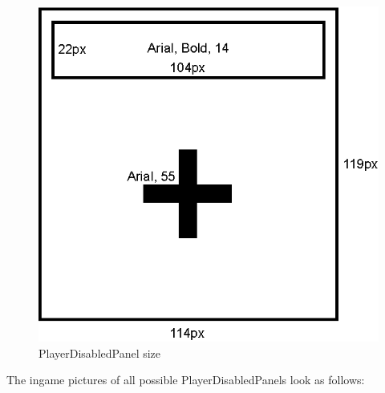 \begin{figure}[h!]
	\centering
	\includegraphics[scale=1]{gui-imgs/playerdisabledpanel-size}
	\caption{PlayerDisabledPanel size}
\end{figure}

\noindent The ingame pictures of all possible PlayerDisabledPanels look as follows:

